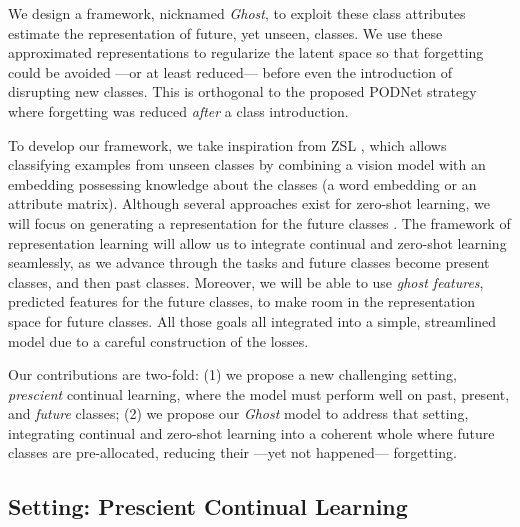 We design a framework, nicknamed \textit{Ghost}, to exploit these class attributes estimate the
representation of future, yet unseen, classes. We use these approximated representations to
regularize the latent space so that forgetting could be avoided ---or at least reduced--- before
even the introduction of disrupting new classes. This is orthogonal to the proposed PODNet strategy
where forgetting was reduced \textit{after} a class introduction.

To develop our framework, we take inspiration from \acf{ZSL}
\citep{lampert2009zeroshot,xian2019awa2}, which allows classifying examples from unseen classes by
combining a vision model with an embedding possessing knowledge about the classes (\eg a word
embedding \citep{mikolov2013word2vec,pennington2014glove} or an attribute matrix). Although several
approaches exist for zero-shot learning, we will focus on generating a representation for the future
classes \citep{bucher2017zeroshot_gmmn, kumar2018synthesized_zeroshot,
    xian2018feature_generating_zeroshot}. The framework of representation learning will allow us to
integrate continual and zero-shot learning seamlessly, as we advance through the tasks and future
classes become present classes, and then past classes. Moreover, we will be able to use
\textit{ghost features}, predicted features for the future classes, to make room in the
representation space for future classes. All those goals all integrated into a simple, streamlined
model due to a careful construction of the losses.

Our contributions are two-fold: (1) we propose a new challenging setting,
\textit{prescient} continual learning, where the model must perform well on past, present, and
\textit{future} classes; (2) we propose our \textit{Ghost} model to address that setting,
integrating continual and zero-shot learning into a coherent whole where future classes are
pre-allocated, reducing their ---yet not happened--- forgetting.


\subsection{Setting: Prescient Continual Learning}
\label{sec:ghost_setting}

